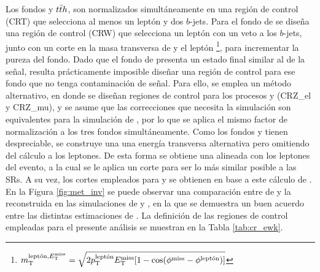 Los fondos \ttbarph y $t\bar{t} h$, son normalizados simultáneamente en una región de control (CRT) que selecciona al menos un leptón y dos $b$-jets. Para el fondo de \wph se diseña una región de control (CRW) que selecciona un leptón con un veto a los $b$-jets, junto con un corte en la masa transversa de \met y el leptón \footnote{$m_{\text{T}}^{\text{leptón}, E_{\text{T}}^{\text{miss}}} = \sqrt{2p_{\text{T}}^{\text{leptón}}E_{\text{T}}^{\text{miss}}[1-\cos(\phi^{\text{miss}}-\phi^{\text{leptón}})]}$}, para incrementar la pureza del fondo. Dado que el fondo de \znunuph presenta un estado final similar al de la señal, resulta prácticamente imposible diseñar una región de control para ese fondo que no tenga contaminación de señal. Para ello, se emplea un método alternativo, en donde se diseñan regiones de control para los procesos \zeeph y \zmumuph (CRZ\_el y CRZ\_mu), y se asume que las correcciones que necesita la simulación son equivalentes para la simulación de \znunuph, por lo que se aplica el mismo factor de normalización a los tres fondos simultáneamente. Como los fondos \zeeph y \zmumuph tienen \met despreciable, se construye una una energía transversa alternativa pero omitiendo del cálculo a los leptones. De esta forma se obtiene una \met alineada con los leptones del evento, a la cual se le aplica un corte para ser lo más similar posible a las SRs. A su vez, los cortes empleados para \dphijetmet y \dphigammet se obtienen en base a este cálculo de \met. En la Figura \ref{fig:met_inv} se puede observar una comparación entre \met de \znunuph y la reconstruida en las simulaciones de \zeeph y \zmumuph, en la que se demuestra un buen acuerdo entre las distintas estimaciones de \met. La definición de las regiones de control empleadas para el presente análisis se muestran en la Tabla \ref{tab:cr_ewk}.

